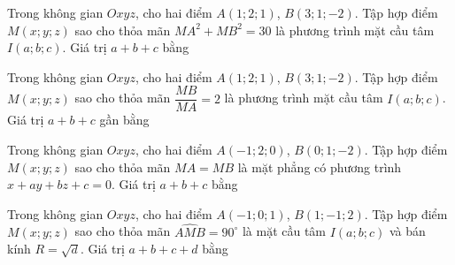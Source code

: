 \begin{ex}%
	Trong không gian $Oxyz$, cho hai điểm $A(1;2;1)$, $B(3;1;-2)$. Tập hợp điểm $M(x;y;z)$ sao cho thỏa mãn $MA^2+MB^2=30$ là phương trình mặt cầu tâm $I(a;b;c)$. Giá trị $a+b+c$ bằng
\end{ex}
\begin{ex}%
	Trong không gian $Oxyz$, cho hai điểm $A(1;2;1)$, $B(3;1;-2)$. Tập hợp điểm $M(x;y;z)$ sao cho thỏa mãn $\dfrac{MB}{MA}=2$ là phương trình mặt cầu tâm $I(a;b;c)$. Giá trị $a+b+c$ gần bằng
\end{ex}
\begin{ex}%
	Trong không gian $Oxyz$, cho hai điểm $A(-1;2;0)$, $B(0;1;-2)$. Tập hợp điểm $M(x;y;z)$ sao cho thỏa mãn $MA=MB$ là mặt phẳng có phương trình $x+ay+bz+c=0$. Giá trị $a+b+c$ bằng
\end{ex}
\begin{ex}%
	Trong không gian $Oxyz$, cho hai điểm $A(-1;0;1)$, $B(1;-1;2)$. Tập hợp điểm $M(x;y;z)$ sao cho thỏa mãn $\widehat{AMB}=90^\circ$ là mặt cầu tâm $I(a;b;c)$ và bán kính $R=\sqrt{d}$. Giá trị $a+b+c+d$ bằng
\end{ex}
